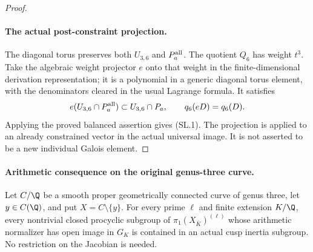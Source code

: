 \begin{proof}
\paragraph{The actual post-constraint projection.}
The diagonal torus preserves both $U_{3,6}$ and $P_a^{\rm all}$.
The quotient $Q_6$ has weight $t^3$. Take the algebraic weight
projector $e$ onto that weight in the finite-dimensional
derivation representation; it is a polynomial in a generic
diagonal torus element, with the denominators cleared in the
usual Lagrange formula. It satisfies
\[
 e(U_{3,6}\cap P_a^{\rm all})\subset U_{3,6}\cap P_a,
                    \qquad q_6(eD)=q_6(D).
\]
Applying the proved balanced assertion gives (SL.1).
The projection is applied to an already constrained vector in
the actual universal image. It is not asserted to be a new
individual Galois element.
\end{proof}

\paragraph{Arithmetic consequence on the original genus-three curve.}
Let $C/\Q$ be a smooth proper geometrically connected curve of
genus three, let $y\in C(\Q)$, and put $X=C\setminus\{y\}$.
For every prime $\ell$ and finite extension $K/\Q$, every nontrivial
closed procyclic subgroup of $\pi_1(X_{\overline K})^{(\ell)}$
whose arithmetic normalizer has open image in $G_K$ is contained
in an actual cusp inertia subgroup. No restriction on the
Jacobian is needed.

